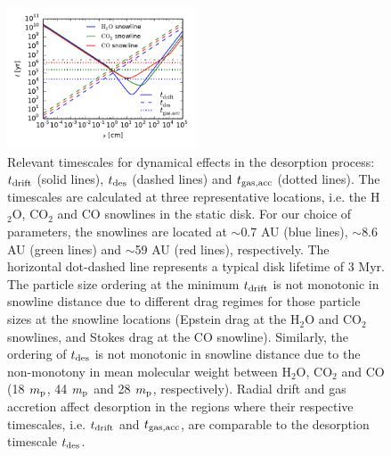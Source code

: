 \documentclass[apj]{emulateapj}
\begin{document}
\begin{figure}[h!]
\centering
\includegraphics[width=0.5\textwidth]{drift_timescales_betaS1_gas_acc_new.pdf}
\caption{Relevant timescales for dynamical effects in the desorption process: $t_{\rm drift}$ (solid lines), $t_{\rm des}$ (dashed lines) and $t_{\rm gas, acc}$ (dotted lines). The timescales are calculated at three representative locations, i.e. the H$_2$O, CO$_2$ and CO snowlines in the static disk. For our choice of parameters, the snowlines are located at $\sim$0.7 AU (blue lines), $\sim$8.6 AU (green lines) and $\sim$59 AU (red lines), respectively. The horizontal dot-dashed line represents a typical disk lifetime of 3 Myr. The particle size ordering at the minimum $t_{\rm drift}$ is not monotonic in snowline distance due to different drag regimes for those particle sizes at the snowline locations (Epstein drag at the H$_2$O and CO$_2$ snowlines, and Stokes drag at the CO snowline). Similarly, the ordering of $t_{\rm des}$ is not monotonic in snowline distance due to the non-monotony in mean molecular weight between H$_2$O, CO$_2$ and CO (18 $m_{\rm p}$, 44 $m_{\rm p}$ and 28 $m_{\rm p}$, respectively). Radial drift and gas accretion affect desorption in the regions where their respective timescales, i.e. $t_{\rm drift}$ and $t_{\rm gas, acc}$, are comparable to the desorption timescale $t_{\rm des}$.} 
\label{fig:timescales}
\end{figure}
\end{document}
